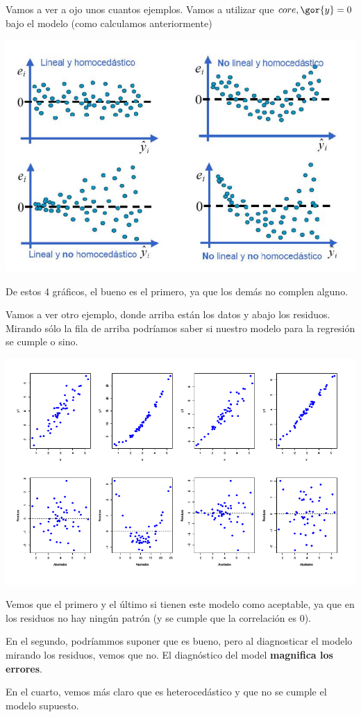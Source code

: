 \documentclass[palatino,nochap]{apuntes}
\begin{document}
\begin{example}
	Vamos a ver a ojo unos cuantos ejemplos. Vamos a utilizar que $cor{e,\gor{y}} = 0$ bajo el modelo (como calculamos anteriormente)

\begin{center}
\includegraphics[scale=0.6]{img/diagmodelo.png}
\end{center}

De estos 4 gráficos, el bueno es el primero, ya que los demás no complen alguno.
\end{example}

\begin{example}
Vamos a ver otro ejemplo, donde arriba están los datos y abajo los residuos. Mirando sólo la fila de arriba podríamos saber si nuestro modelo para la regresión se cumple o sino.


\begin{center}
\includegraphics[scale=0.6]{img/diagmodelo_2.png}
\end{center}

Vemos que el primero y el último si tienen este modelo como aceptable, ya que en los residuos no hay ningún patrón (y se cumple que la correlación es 0).

En el segundo, podríammos suponer que es bueno, pero al diagnosticar el modelo mirando los residuos, vemos que no. El diagnóstico del model \textbf{magnifica los errores}.

En el cuarto, vemos más claro que es heterocedástico y que no se cumple el modelo supuesto.
\end{example}
\end{document}
